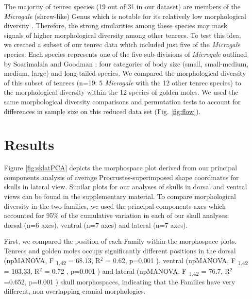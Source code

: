 \documentclass[12pt,a4paper]{article}
\begin{document}
	The majority of tenrec species (19 out of 31 in our dataset) are members of the \textit{Microgale} (shrew-like) Genus which is notable for its relatively low morphological diversity \citep{Soarimalala2011, Jenkins2003}. Therefore, the strong similarities among these species may mask signals of higher morphological diversity among other tenrecs. 
	To test this idea, we created a subset of our tenrec data which included just five of the \textit{Microgale} species. Each species represents one of the five sub-divisions of \textit{Microgale} outlined by Soarimalala and Goodman \citeyearpar{Soarimalala2011}: four categories of body size (small, small-medium, medium, large) and long-tailed species. We compared the morphological diversity of this subset of tenrecs (n=19: 5 \textit{Microgale} with the 12 other tenrec species) to the morphological diversity within the 12 species of golden moles. We used the same morphological diversity comparisons and permutation tests to account for differences in sample size on this reduced data set (Fig. \ref{fig:flow}).
	 



\section{Results}
 
	Figure \ref{fig:sklatPCA} depicts the morphospace plot derived from our principal components analysis of average Procrustes-superimposed shape coordinates for skulls in lateral view. Similar plots for our analyses of skulls in dorsal and ventral views can be found in the supplementary material.
	To compare morphological diversity in the two families, we used the principal components axes which accounted for 95\% of the cumulative variation in each of our skull analyses: dorsal (n=6 axes), ventral (n=7 axes) and lateral (n=7 axes). 
	
	First, we compared the position of each Family within the morphospace plots. Tenrecs and golden moles occupy significantly different positions in the dorsal 	(npMANOVA, F \textsubscript{1,42} = 68.13, R$^2$ = 0.62, p=0.001 ), ventral (npMANOVA, F \textsubscript{1,42} = 103.33, R$^2$ = 0.72 , p=0.001 ) and lateral (npMANOVA, F \textsubscript{1,42} = 76.7, R$^2$=0.652, p=0.001 ) skull morphospaces,  indicating that the Families have very different, non-overlapping cranial morphologies. 
	
\end{document}
